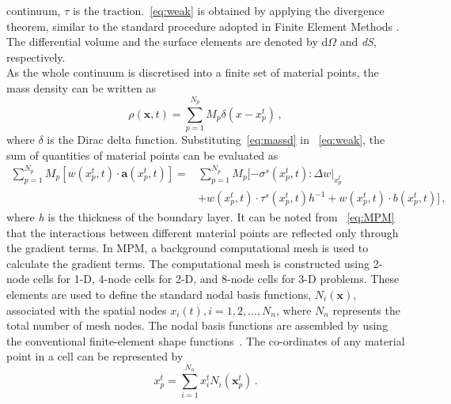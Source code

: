 continuum, $\tau$ is the traction.~\cref{eq:weak} is obtained by applying 
the divergence theorem, similar to the standard procedure adopted in Finite 
Element Methods \citep{Sulsky1994,Sulsky1995, Chen2002}. The differential 
volume and the surface elements are denoted by d$\Omega$ and \textit{dS}, 
respectively. \\
As the whole continuum is discretised into a finite set of material points, the 
mass density can be written as
\begin{equation}
\rho(\mathbf{x},t)=\sum\limits_{\mathit{p}=1}^{\mathit{N}_{p}}
{\mathit{M}_{p}\delta(\mathbf{\mathit{x}}-\mathbf{\mathit{x}}_{p}^{t})} \,,
\label{eq:massd}
\end{equation}
where $\delta$ is the Dirac delta function. Substituting~\cref{eq:massd} in 
~\cref{eq:weak}, the sum of quantities of material points can be evaluated 
as
\begin{align}
\nonumber
\sum\limits_{\mathit{p}=1}^{\mathit{N}_{p}} 
\mathit{M}_{p}[\mathbf{\mathit{w}}(\mathit{x}_{p}^{t},t) \cdot 
\mathbf{a}(\mathit{x}_{p}^{t},t)] = & 
\sum\limits_{\mathit{p}=1}^{\mathit{N}_{p}} \mathit{M}_{p} 
[-\sigma^{s}(\mathit{x}_{p}^{t},t): \Delta 
\mathbf{\mathit{w}}|_{\mathit{x}_{p}^{t}} \\ 
& + \mathbf{\mathit{w}}(\mathit{x}_{p}^{t},t) \cdot 
\tau^{s}(\mathit{x}_{p}^{t},t)h^{-1} +  
\mathbf{\mathit{w}}(\mathit{x}_{p}^{t},t) \cdot 
\mathbf{\mathit{b}}(\mathit{x}_{p}^{t},t)] \,,
\label{eq:MPM}
\end{align}
where \textit{h} is the thickness of the boundary layer. It can be noted from 
~\cref{eq:MPM} that the interactions between different material points are 
reflected only through the gradient terms. In MPM, a background computational 
mesh is used to calculate the gradient terms. The computational mesh is 
constructed using 2-node cells for 1-D, 4-node cells for 2-D, and 8-node cells 
for 3-D problems. These elements are used to define the standard nodal basis 
functions, $\mathit{N}_{i}(\mathbf{x})$, associated with the spatial nodes 
$\mathbf{\mathit{x}}_{i}(t), \mathit{i}=1,2,\dots,\mathit{N}_{n}$, where 
$\mathit{N}_{n}$ represents the total number of mesh nodes. The nodal basis 
functions are assembled by using the conventional finite-element shape 
functions~\citep{Chen2002}. The co-ordinates of any material point in a cell 
can be represented by
%
\begin{equation}
\mathbf{\mathit{x}}_{p}^{t} = \sum\limits_{\mathit{i}=1}^{\mathit{N}_{n}} 
\mathbf{\mathit{x}}_{\mathit{i}}^{t}\mathit{N}_{\mathit{i}}(\mathbf{x}_{p}^{t}) 
\,.
\label{eq:x}
\end{equation}
